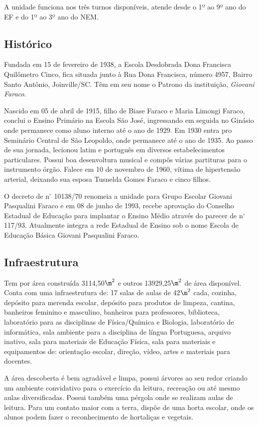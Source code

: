 A unidade funciona nos três turnos disponíveis, atende desde o 1º ao 9º ano do \ac{EF} e do 1º ao 3º ano do \ac{NEM}.

\subsection{Histórico}
Fundada em 15 de fevereiro de 1938, a Escola Desdobrada Dona Francisca Quilômetro Cinco, fica situada junto à Rua Dona Francisca, número 4957, Bairro Santo Antônio, Joinville/SC. Têm em seu nome o Patrono da instituição, \emph{Giovani Faraco}.

Nascido em 05 de abril de 1915, filho de Biase Faraco e Maria Limongi Faraco, conclui o Ensino Primário na Escola São José, ingressando em seguida no Ginásio onde permanece como aluno interno até o ano de 1929. Em 1930 entra pro Seminário Central de São Leopoldo, onde permanece até o ano de 1935. Ao passo de sua jornada, lecionou latim e português em diversos estabelecimentos particulares. Possui boa desenvoltura musical e compôs várias partituras para o instrumento órgão. Falece em 10 de novembro de 1960, vítima de hipertensão arterial, deixando sua esposa Tusnelda Gomes Faraco e cinco filhos.

O decreto de n$^\circ$ 10138/70 renomeia a unidade para Grupo Escolar Giovani Pasqualini Faraco e em 08 de junho de 1993, recebe aprovação do Conselho Estadual de Educação para implantar o Ensino Médio através do parecer de n$^\circ$ 117/93. Atualmente integra a rede Estadual de Ensino sob o nome Escola de Educação Básica Giovani Pasqualini Faraco.

\subsection{Infraestrutura}
Tem por área construída 3114,50$\m^2$ e outros 13929,25$\m^2$ de área disponível. Conta com uma infraestrutura de: 17 salas de aulas de 42$\m^2$ cada, cozinha, depósito para merenda escolar, depósito para produtos de limpeza, cantina, banheiros feminino e masculino, banheiros para professores, biblioteca, laboratório para as disciplinas de Física/Química e Biologia, laboratório de informática, sala ambiente para a disciplina de língua Portuguesa, arquivo inativo, sala para materiais de Educação Física, sala para materiais e equipamentos de: orientação escolar, direção, vídeo, artes e materiais para docentes.

A área descoberta é bem agradável e limpa, possui árvores ao seu redor criando um ambiente convidativo para o exercício da leitura, recreação ou até mesmo aulas diversificadas. Possui também uma pérgola onde se realizam aulas de leitura. Para um contato maior com a terra, dispõe de uma horta escolar, onde os alunos podem fazer o reconhecimento de hortaliças e vegetais.

